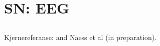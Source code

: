 \section{SN: EEG}
\label{sec:EEG}


\subsection{} 
Kjernereferanse: \citep{Naess2017} and Naess et al (in preparation).


\subsection{ }
